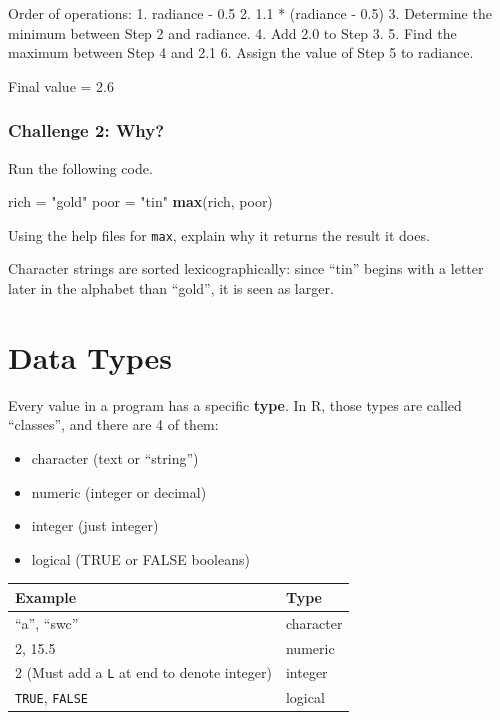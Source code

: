 \documentclass[]{book}
\newenvironment{Shaded}{\begin{snugshade}}{\end{snugshade}}
\newcommand{\KeywordTok}[1]{\textcolor[rgb]{0.13,0.29,0.53}{\textbf{#1}}}
\newcommand{\StringTok}[1]{\textcolor[rgb]{0.31,0.60,0.02}{#1}}
\newcommand{\NormalTok}[1]{#1}
\providecommand{\tightlist}{%
  \setlength{\itemsep}{0pt}\setlength{\parskip}{0pt}}
\begin{document}
Order of operations: 1. radiance - 0.5 2. 1.1 * (radiance - 0.5) 3.
Determine the minimum between Step 2 and radiance. 4. Add 2.0 to Step 3.
5. Find the maximum between Step 4 and 2.1 6. Assign the value of Step 5
to radiance.

Final value = 2.6

\subsubsection*{Challenge 2: Why?}\label{challenge-2-why}

Run the following code.

\begin{Shaded}
\begin{Highlighting}[]
\NormalTok{rich =}\StringTok{ "gold"}
\NormalTok{poor =}\StringTok{ "tin"}
\KeywordTok{max}\NormalTok{(rich, poor)}
\end{Highlighting}
\end{Shaded}

Using the help files for \texttt{max}, explain why it returns the result
it does.

Character strings are sorted lexicographically: since ``tin'' begins
with a letter later in the alphabet than ``gold'', it is seen as larger.

\section{Data Types}\label{data-types}

Every value in a program has a specific \textbf{type}. In R, those types
are called ``classes'', and there are 4 of them:

\begin{itemize}
\tightlist
\item
  character (text or ``string'')
\item
  numeric (integer or decimal)
\item
  integer (just integer)
\item
  logical (TRUE or FALSE booleans)
\end{itemize}

\begin{longtable}[]{@{}ll@{}}
\toprule
Example & Type\tabularnewline
\midrule
\endhead
``a'', ``swc'' & character\tabularnewline
2, 15.5 & numeric\tabularnewline
2 (Must add a \texttt{L} at end to denote integer) &
integer\tabularnewline
\texttt{TRUE}, \texttt{FALSE} & logical\tabularnewline
\bottomrule
\end{longtable}
\end{document}
